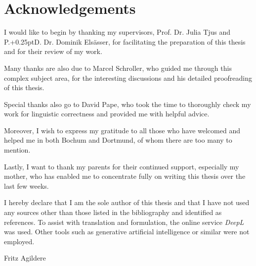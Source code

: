 \chapter*{Acknowledgements}
\label{ch:acknowledgements}

I would like to begin by thanking my supervisors, Prof. Dr. Julia Tjus and P{\kern-0.25pt}.{\kern+0.25pt}D. Dr. Dominik Elsässer,
for facilitating the preparation of this thesis and for their review of my work.

Many thanks are also due to Marcel Schroller, who guided me through this complex subject
area, for the interesting discussions and his detailed proofreading of this thesis.

Special thanks also go to David Pape, who took the time to thoroughly check my work
for linguistic correctness and provided me with helpful advice.

Moreover, I wish to express my gratitude to all those who have welcomed and helped me in
both Bochum and Dortmund, of whom there are too many to mention.

Lastly, I want to thank my parents for their continued support, especially my mother,
who has enabled me to concentrate fully on writing this thesis over the last few weeks.

\vfill

I hereby declare that I am the sole author of this thesis and that I have not used
any sources other than those listed in the bibliography and identified as references.
To assist with translation and formulation, the online service \emph{DeepL} was used.
Other tools such as generative artificial intelligence or similar were not employed.

Fritz Agildere
